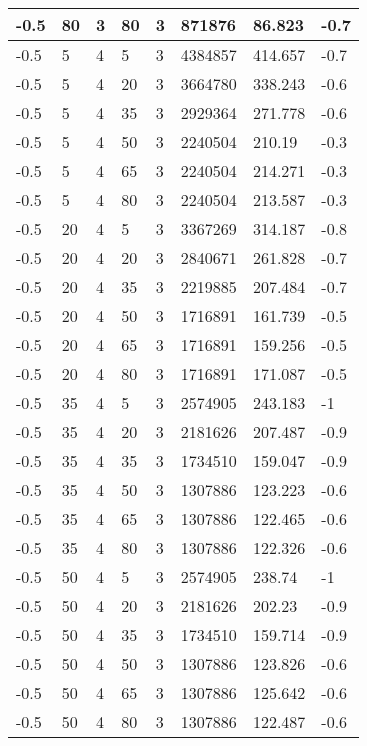\begin{longtable}{|p{1.4cm}|p{1.4cm}|p{1.4cm}|p{1.4cm}|p{1.4cm}|p{1.4cm}|p{1.4cm}|p{1.5cm}|}
        -0.5 & 80 & 3 & 80 & 3 & 871876 & 86.823 & -0.7 \\ \hline
        -0.5 & 5 & 4 & 5 & 3 & 4384857 & 414.657 & -0.7 \\ \hline
        -0.5 & 5 & 4 & 20 & 3 & 3664780 & 338.243 & -0.6 \\ \hline
        -0.5 & 5 & 4 & 35 & 3 & 2929364 & 271.778 & -0.6 \\ \hline
        -0.5 & 5 & 4 & 50 & 3 & 2240504 & 210.19 & -0.3 \\ \hline
        -0.5 & 5 & 4 & 65 & 3 & 2240504 & 214.271 & -0.3 \\ \hline
        -0.5 & 5 & 4 & 80 & 3 & 2240504 & 213.587 & -0.3 \\ \hline
        -0.5 & 20 & 4 & 5 & 3 & 3367269 & 314.187 & -0.8 \\ \hline
        -0.5 & 20 & 4 & 20 & 3 & 2840671 & 261.828 & -0.7 \\ \hline
        -0.5 & 20 & 4 & 35 & 3 & 2219885 & 207.484 & -0.7 \\ \hline
        -0.5 & 20 & 4 & 50 & 3 & 1716891 & 161.739 & -0.5 \\ \hline
        -0.5 & 20 & 4 & 65 & 3 & 1716891 & 159.256 & -0.5 \\ \hline
        -0.5 & 20 & 4 & 80 & 3 & 1716891 & 171.087 & -0.5 \\ \hline
        -0.5 & 35 & 4 & 5 & 3 & 2574905 & 243.183 & -1 \\ \hline
        -0.5 & 35 & 4 & 20 & 3 & 2181626 & 207.487 & -0.9 \\ \hline
        -0.5 & 35 & 4 & 35 & 3 & 1734510 & 159.047 & -0.9 \\ \hline
        -0.5 & 35 & 4 & 50 & 3 & 1307886 & 123.223 & -0.6 \\ \hline
        -0.5 & 35 & 4 & 65 & 3 & 1307886 & 122.465 & -0.6 \\ \hline
        -0.5 & 35 & 4 & 80 & 3 & 1307886 & 122.326 & -0.6 \\ \hline
        -0.5 & 50 & 4 & 5 & 3 & 2574905 & 238.74 & -1 \\ \hline
        -0.5 & 50 & 4 & 20 & 3 & 2181626 & 202.23 & -0.9 \\ \hline
        -0.5 & 50 & 4 & 35 & 3 & 1734510 & 159.714 & -0.9 \\ \hline
        -0.5 & 50 & 4 & 50 & 3 & 1307886 & 123.826 & -0.6 \\ \hline
        -0.5 & 50 & 4 & 65 & 3 & 1307886 & 125.642 & -0.6 \\ \hline
        -0.5 & 50 & 4 & 80 & 3 & 1307886 & 122.487 & -0.6 \\ \hline

\end{longtable}
